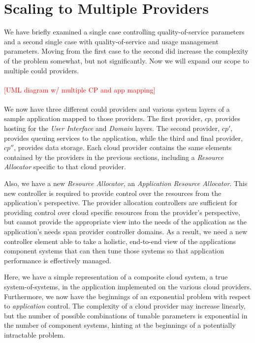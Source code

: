 \documentclass[times, 10pt,twocolumn]{article}
\begin{document}
\section{Scaling to Multiple Providers}\label{sec:multiple}
We have briefly examined a single case controlling quality-of-service parameters and a second single case with quality-of-service and usage management parameters.  Moving from the first case to the second did increase the complexity of the problem somewhat, but not significantly.  Now we will expand our scope to multiple could providers.
\\
\\
\textcolor{red}{[UML diagram w/ multiple CP and app mapping]}
\\
\\
We now have three different could providers and various system layers of a sample application mapped to those providers.  The first provider, $ cp $, provides hosting for the \textit{User Interface} and \textit{Domain} layers.  The second provider, $ cp' $, provides queuing services to the application, while the third and final provider, $ cp'' $, provides data storage.  Each cloud provider contains the same elements contained by the providers in the previous sections, including a \textit{Resource Allocator} specific to that cloud provider.

Also, we have a new \textit{Resource Allocator}, an \textit{Application Resource Allocator}.  This new controller is required to provide control over the resources from the application's perspective.  The provider allocation controllers are sufficient for providing control over cloud specific resources from the provider's perspective, but cannot provide the appropriate view into the needs of the application as the application's needs span provider controller domains. As a result, we need a new controller element able to take a holistic, end-to-end view of the applications component systems that can then tune those systems so that application performance is effectively managed.

Here, we have a simple representation of a composite cloud system, a true system-of-systems, in the application implemented on the various cloud providers.  Furthermore, we now have the beginnings of an exponential problem with respect to \textit{application} control.  The complexity of a cloud provider may increase linearly, but the number of possible combinations of tunable parameters is exponential in the number of component systems, hinting at the beginnings of a potentially intractable problem.
\end{document}
